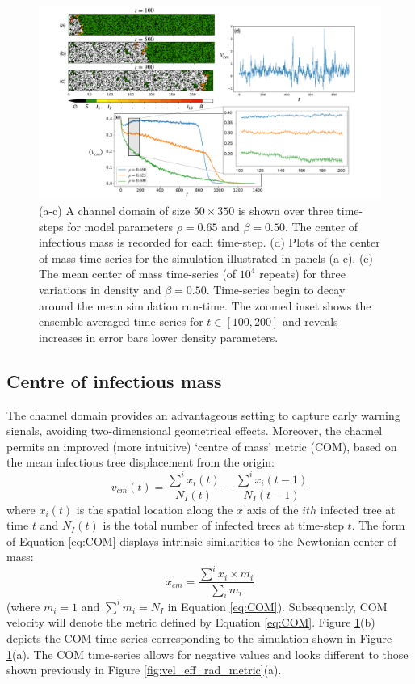 \newpage

\begin{figure}
    \centering
    \includegraphics[scale=0.30]{chapter4/figures/figure1-channel-domain.pdf}
    \caption{
    (a-c) A channel domain of size $50\times350$ is shown over three time-steps for model parameters $\rho=0.65$ and $\beta=0.50$. 
    The center of infectious mass is recorded for each time-step. 
    (d) Plots of the center of mass time-series for the simulation illustrated in panels (a-c). 
    (e) The mean center of mass time-series (of $10^4$ repeats) for three variations in density and $\beta=0.50$. 
    Time-series begin to decay around the mean simulation run-time.  
    The zoomed inset shows the ensemble averaged time-series for $t\in[100, 200]$ and reveals increases in error bars lower density parameters.
    }
    \label{fig:ews-primer}
\end{figure}

\subsection{Centre of infectious mass}

The channel domain provides an advantageous setting to capture early warning signals, avoiding two-dimensional geometrical effects.
Moreover, the channel permits an improved (more intuitive) `centre of mass' metric (COM), based on the mean infectious tree displacement from the origin:
\begin{equation}
   v_{cm}(t) = \frac{\sum^i x_i(t)}{N_I(t)} - \frac{\sum^i x_i(t-1)}{N_I(t-1)}
   \label{eq:COM}
\end{equation}
where $x_i(t)$ is the spatial location along the $x$ axis of the $ith$ infected tree at 
time $t$ and $N_I(t)$ is the total number of infected trees at time-step $t$. 
 The form of Equation \ref{eq:COM} displays intrinsic similarities to the Newtonian center of mass:
 \[x_{cm} = \frac{\sum^i x_i\times m_i}{\sum_i m_i}\]
(where $m_i=1$ and $\sum^im_i= N_I$ in Equation \ref{eq:COM}).
Subsequently, COM velocity will denote the metric defined by Equation \ref{eq:COM}. 
Figure \ref{fig:ews-primer}(b) depicts the COM time-series corresponding to the simulation shown in Figure \ref{fig:ews-primer}(a). 
The COM time-series allows for negative values and looks different to those shown previously in Figure \ref{fig:vel_eff_rad_metric}(a).

